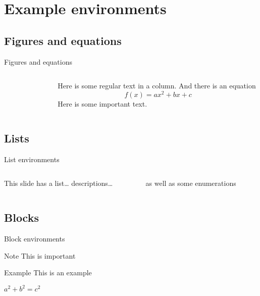 \documentclass[aspectratio=169]{beamer}
\begin{document}
\section{Example environments}
\subsection{Figures and equations}
\begin{frame}{Figures and equations}
  \begin{columns}[onlytextwidth]
    \begin{column}{0.5\textwidth}
        \centering
        \begin{figure}
        \end{figure}
    \end{column}
    \begin{column}{0.4\textwidth}
    Here is some regular text in a column. And there is an equation
    \begin{displaymath}
      f(x)=ax^2+bx+c
    \end{displaymath}
    Here is some \alert{important} text.
    \end{column}
    \end{columns}
\end{frame}

\subsection{Lists}
\begin{frame}{List environments}
  \begin{columns}[onlytextwidth]
    \begin{column}{0.5\textwidth}
      This slide has a list\dots
      \blinditemize[3]
      \vspace*{5mm}
      descriptions\dots
      \blinddescription[2]
    \end{column}
    \begin{column}{0.5\textwidth}
      as well as some enumerations
      \blindenumerate[4]
    \end{column}
    \end{columns}
\end{frame}

\subsection{Blocks}
\begin{frame}{Block environments}
    \begin{alertblock}{Note}
        This is important
    \end{alertblock}
    
    \begin{exampleblock}{Example}
        This is an example
    \end{exampleblock}

    \begin{theorem}[Pythagoras] 
        $ a^2 + b^2 = c^2$
    \end{theorem}
\end{frame}
\end{document}
